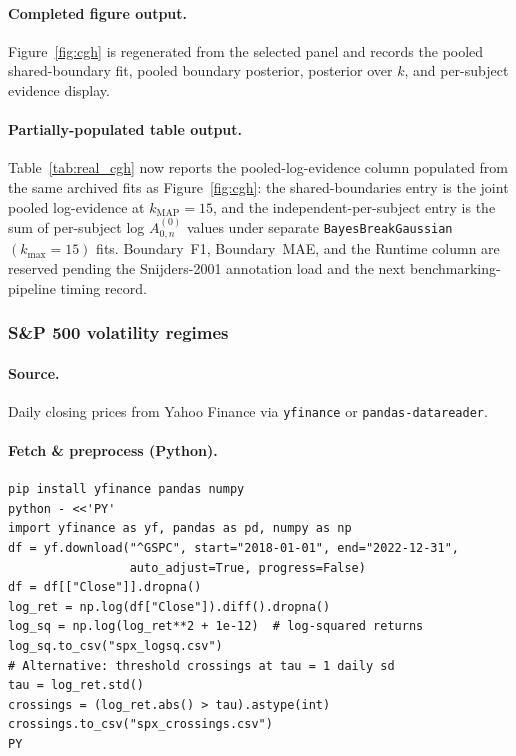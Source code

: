 \paragraph{Completed figure output.}
Figure~\ref{fig:cgh} is regenerated from the selected panel and records the pooled shared-boundary fit, pooled boundary posterior, posterior over $k$, and per-subject evidence display.

\paragraph{Partially-populated table output.}
Table~\ref{tab:real_cgh} now reports the pooled-log-evidence column populated from the same archived fits as Figure~\ref{fig:cgh}: the shared-boundaries entry is the joint pooled log-evidence at $k_{\mathrm{MAP}}=15$, and the independent-per-subject entry is the sum of per-subject log $A^{(0)}_{0,n}$ values under separate \texttt{BayesBreakGaussian}$(k_{\max}=15)$ fits. Boundary~F1, Boundary~MAE, and the Runtime column are reserved pending the Snijders-2001 annotation load and the next benchmarking-pipeline timing record.

\subsubsection{S\&P 500 volatility regimes}
\label{app:real-data-spx}

\paragraph{Source.}
Daily closing prices from Yahoo Finance via \texttt{yfinance} or \texttt{pandas-datareader}.

\paragraph{Fetch \& preprocess (Python).}
\begin{verbatim}
pip install yfinance pandas numpy
python - <<'PY'
import yfinance as yf, pandas as pd, numpy as np
df = yf.download("^GSPC", start="2018-01-01", end="2022-12-31",
                 auto_adjust=True, progress=False)
df = df[["Close"]].dropna()
log_ret = np.log(df["Close"]).diff().dropna()
log_sq = np.log(log_ret**2 + 1e-12)  # log-squared returns
log_sq.to_csv("spx_logsq.csv")
# Alternative: threshold crossings at tau = 1 daily sd
tau = log_ret.std()
crossings = (log_ret.abs() > tau).astype(int)
crossings.to_csv("spx_crossings.csv")
PY
\end{verbatim}


